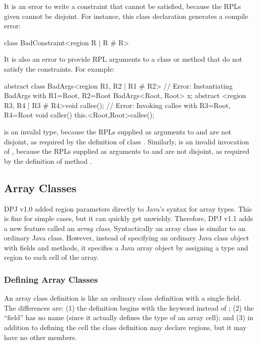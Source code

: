 It is an error to write a constraint that cannot be satisfied, because
the RPLs given cannot be disjoint.  For instance, this class
declaration generates a compile error:
%
\begin{dpjlisting}
class BadConstraint<region R | R # R> {}
\end{dpjlisting}

It is also an error to provide RPL arguments to a class or method that
do not satisfy the constraints.  For example:
%
\begin{dpjlisting}
abstract class BadArgs<region R1, R2 | R1 # R2> {
    // Error:  Instantiating BadArgs with R1=Root, R2=Root
    BadArgs<Root, Root> x;
    abstract <region R3, R4 | R3 # R4>void callee();
    // Error:  Invoking callee with R3=Root, R4=Root
    void caller() {
        this.<Root,Root>callee();
    }
}
\end{dpjlisting}
%
 is an invalid type, because the RPLs
supplied as arguments to  and  are not disjoint, as
required by the definition of class .  Similarly,
 is an invalid invocation of
, because the RPLs supplied as arguments to  and
 are not disjoint, as required by the definition of method
.

\subsection{Array Classes%
\label{sec:classes:array}}

DPJ v1.0 added region parameters directly to Java's syntax for array
types.  This is fine for simple cases, but it can quickly get
unwieldy.  Therefore, DPJ v1.1 adds a new feature called an
\emph{array class}.  Syntactically an array class is similar to an
ordinary Java class.  However, instead of specifying an ordinary Java
class object with fields and methods, it specifies a Java array object
by assigning a type and region to each cell of the array.

\subsubsection{Defining Array Classes
\label{sec:classes:array:defining}}

An array class definition is like an ordinary class definition with a
single field.  The differences are: (1) the definition begins with the
keyword  instead of ; (2) the ``field'' has
no name (since it actually defines the type of an array cell); and (3)
in addition to defining the cell the class definition may declare
regions, but it may have no other members.

